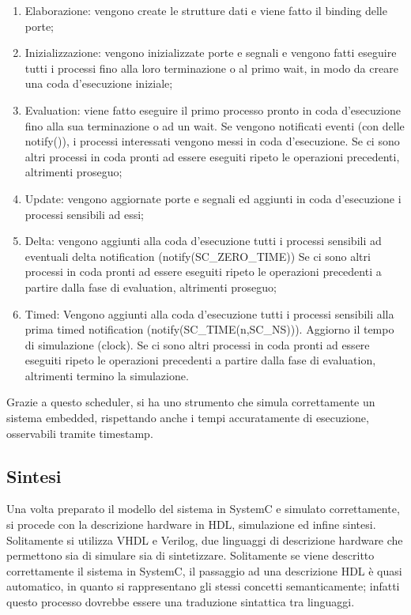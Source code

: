 \documentclass[11pt]{article} %
\begin{document}
\begin{enumerate}
\item Elaborazione: vengono create le strutture dati e viene fatto il binding delle porte;
\item Inizializzazione: vengono inizializzate porte e segnali e vengono fatti eseguire tutti i processi fino alla loro terminazione o al primo wait, in modo da creare una coda d'esecuzione iniziale;
\item Evaluation: viene fatto eseguire il primo processo pronto in coda d'esecuzione fino alla sua terminazione o ad un wait. Se vengono notificati eventi (con delle notify()), i processi interessati vengono messi in coda d'esecuzione. Se ci sono altri processi in coda pronti ad essere eseguiti ripeto le operazioni precedenti, altrimenti proseguo;
\item Update: vengono aggiornate porte e segnali ed aggiunti in coda d'esecuzione i processi sensibili ad essi;
\item Delta: vengono aggiunti alla coda d'esecuzione tutti i processi sensibili ad eventuali delta notification (notify(SC\_ZERO\_TIME)) Se ci sono altri processi in coda pronti ad essere eseguiti ripeto le operazioni precedenti a partire dalla fase di evaluation, altrimenti proseguo;
\item Timed: Vengono aggiunti alla coda d'esecuzione tutti i processi sensibili alla prima timed notification (notify(SC\_TIME(n,SC\_NS))). Aggiorno il tempo di simulazione (clock). Se ci sono altri processi in coda pronti ad essere eseguiti ripeto le operazioni precedenti a partire dalla fase di evaluation, altrimenti termino la simulazione.
\end{enumerate}

Grazie a questo scheduler, si ha uno strumento che simula correttamente un sistema embedded, rispettando anche i tempi accuratamente di esecuzione, osservabili tramite timestamp.

\subsection{Sintesi}

Una volta preparato il modello del sistema in SystemC e simulato correttamente, si procede con la descrizione hardware in HDL, simulazione ed infine sintesi. Solitamente si utilizza VHDL e Verilog, due linguaggi di descrizione hardware che permettono sia di simulare sia di sintetizzare. Solitamente se viene descritto correttamente il sistema in SystemC, il passaggio ad una descrizione HDL è quasi automatico, in quanto si rappresentano gli stessi concetti semanticamente; infatti questo processo dovrebbe essere una traduzione sintattica tra linguaggi.
\end{document}
